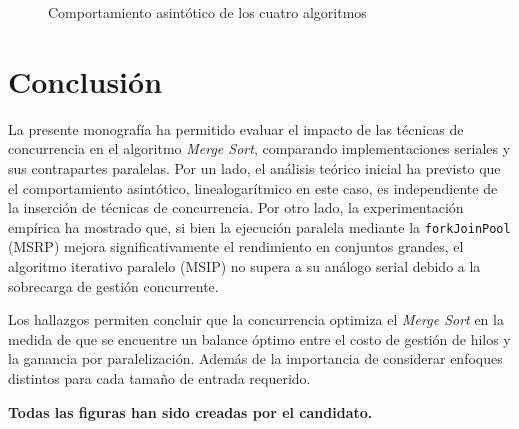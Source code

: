 \documentclass[titlepage]{article}
\begin{document}
\begin{figure}[H]
\begin{minipage}{0.49\textwidth}
	\end{minipage}
	\hfill
	\begin{minipage}{0.49\textwidth}
		\centering
		
	\end{minipage}
	\caption{Comportamiento asintótico de los cuatro algoritmos}
	\label{fig:comparacionCuatro}
\end{figure}

\section{Conclusión}%
La presente monografía ha permitido evaluar el impacto de las técnicas de concurrencia en el algoritmo \textit{Merge Sort}, comparando implementaciones seriales y sus contrapartes paralelas. Por un lado, el análisis teórico inicial ha previsto que el comportamiento asintótico, linealogarítmico en este caso, es independiente de la inserción de técnicas de concurrencia. Por otro lado, la experimentación empírica ha mostrado que, si bien la ejecución paralela mediante la \lstinline|forkJoinPool| (MSRP) mejora significativamente el rendimiento en conjuntos grandes, el algoritmo iterativo paralelo (MSIP) no supera a su análogo serial debido a la sobrecarga de gestión concurrente. 

Los hallazgos permiten concluir que la concurrencia optimiza el \textit{Merge Sort} en la medida de que se encuentre un balance óptimo entre el costo de gestión de hilos y la ganancia por paralelización. Además de la importancia de considerar enfoques distintos para cada tamaño de entrada requerido.


\newpage



\textbf{Todas las figuras han sido creadas por el candidato.}
\end{document}
